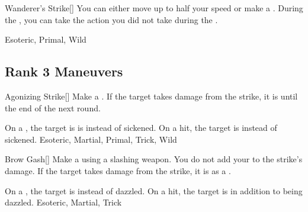 \lowercase{\hypertarget{maneuver:Wanderer's Strike}{}}\label{maneuver:Wanderer's Strike}
\hypertarget{maneuver:Wanderer's Strike}{}
\begin{freeability}[Rank 2]{Wanderer's Strike}[]
You can either move up to half your speed or make a .
During the , you can take the action you did not take during the .


 Esoteric, Primal, Wild
\end{freeability}
\vspace{0.25em}


\subsection{Rank 3 Maneuvers}

\lowercase{\hypertarget{maneuver:Agonizing Strike}{}}\label{maneuver:Agonizing Strike}
\hypertarget{maneuver:Agonizing Strike}{}
\begin{freeability}[Rank 3]{Agonizing Strike}[]
Make a .
If the target takes damage from the strike, it is  until the end of the next round.

\rankline
{} On a , the target is is  instead of sickened.
 On a hit, the target is  instead of sickened.
 Esoteric, Martial, Primal, Trick, Wild
\end{freeability}
\vspace{0.25em}



\lowercase{\hypertarget{maneuver:Brow Gash}{}}\label{maneuver:Brow Gash}
\hypertarget{maneuver:Brow Gash}{}
\begin{freeability}[Rank 3]{Brow Gash}[]
Make a  using a slashing weapon.
You do not add your  to the strike's damage.
If the target takes damage from the strike, it is  as a .

\rankline
{} On a , the target is  instead of dazzled.
 On a hit, the target is  in addition to being dazzled.
 Esoteric, Martial, Trick
\end{freeability}
\vspace{0.25em}



